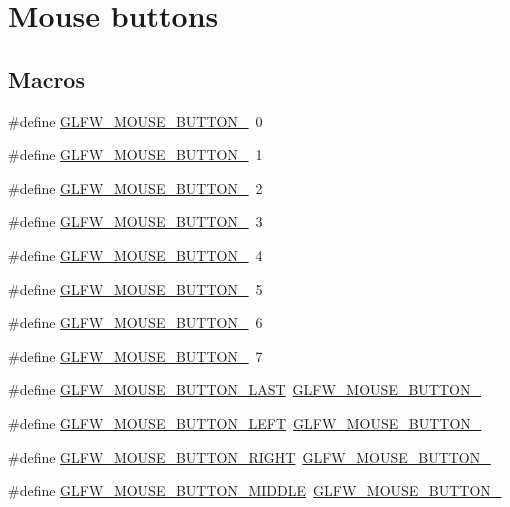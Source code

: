 \hypertarget{group__buttons}{\section{Mouse buttons}
\label{group__buttons}
}
\subsection*{Macros}
\begin{DoxyCompactItemize}
\item 
\#define \hyperlink{group__buttons_ga181a6e875251fd8671654eff00f9112e}{G\-L\-F\-W\-\_\-\-M\-O\-U\-S\-E\-\_\-\-B\-U\-T\-T\-O\-N\-\_}~0
\item 
\#define \hyperlink{group__buttons_ga604b39b92c88ce9bd332e97fc3f4156c}{G\-L\-F\-W\-\_\-\-M\-O\-U\-S\-E\-\_\-\-B\-U\-T\-T\-O\-N\-\_}~1
\item 
\#define \hyperlink{group__buttons_ga0130d505563d0236a6f85545f19e1721}{G\-L\-F\-W\-\_\-\-M\-O\-U\-S\-E\-\_\-\-B\-U\-T\-T\-O\-N\-\_}~2
\item 
\#define \hyperlink{group__buttons_ga53f4097bb01d5521c7d9513418c91ca9}{G\-L\-F\-W\-\_\-\-M\-O\-U\-S\-E\-\_\-\-B\-U\-T\-T\-O\-N\-\_}~3
\item 
\#define \hyperlink{group__buttons_gaf08c4ddecb051d3d9667db1d5e417c9c}{G\-L\-F\-W\-\_\-\-M\-O\-U\-S\-E\-\_\-\-B\-U\-T\-T\-O\-N\-\_}~4
\item 
\#define \hyperlink{group__buttons_gae8513e06aab8aa393b595f22c6d8257a}{G\-L\-F\-W\-\_\-\-M\-O\-U\-S\-E\-\_\-\-B\-U\-T\-T\-O\-N\-\_}~5
\item 
\#define \hyperlink{group__buttons_ga8b02a1ab55dde45b3a3883d54ffd7dc7}{G\-L\-F\-W\-\_\-\-M\-O\-U\-S\-E\-\_\-\-B\-U\-T\-T\-O\-N\-\_}~6
\item 
\#define \hyperlink{group__buttons_ga35d5c4263e0dc0d0a4731ca6c562f32c}{G\-L\-F\-W\-\_\-\-M\-O\-U\-S\-E\-\_\-\-B\-U\-T\-T\-O\-N\-\_}~7
\item 
\#define \hyperlink{group__buttons_gab1fd86a4518a9141ec7bcde2e15a2fdf}{G\-L\-F\-W\-\_\-\-M\-O\-U\-S\-E\-\_\-\-B\-U\-T\-T\-O\-N\-\_\-\-L\-A\-S\-T}~\hyperlink{group__buttons_ga35d5c4263e0dc0d0a4731ca6c562f32c}{G\-L\-F\-W\-\_\-\-M\-O\-U\-S\-E\-\_\-\-B\-U\-T\-T\-O\-N\-\_}
\item 
\#define \hyperlink{group__buttons_gaf37100431dcd5082d48f95ee8bc8cd56}{G\-L\-F\-W\-\_\-\-M\-O\-U\-S\-E\-\_\-\-B\-U\-T\-T\-O\-N\-\_\-\-L\-E\-F\-T}~\hyperlink{group__buttons_ga181a6e875251fd8671654eff00f9112e}{G\-L\-F\-W\-\_\-\-M\-O\-U\-S\-E\-\_\-\-B\-U\-T\-T\-O\-N\-\_}
\item 
\#define \hyperlink{group__buttons_ga3e2f2cf3c4942df73cc094247d275e74}{G\-L\-F\-W\-\_\-\-M\-O\-U\-S\-E\-\_\-\-B\-U\-T\-T\-O\-N\-\_\-\-R\-I\-G\-H\-T}~\hyperlink{group__buttons_ga604b39b92c88ce9bd332e97fc3f4156c}{G\-L\-F\-W\-\_\-\-M\-O\-U\-S\-E\-\_\-\-B\-U\-T\-T\-O\-N\-\_}
\item 
\#define \hyperlink{group__buttons_ga34a4d2a701434f763fd93a2ff842b95a}{G\-L\-F\-W\-\_\-\-M\-O\-U\-S\-E\-\_\-\-B\-U\-T\-T\-O\-N\-\_\-\-M\-I\-D\-D\-L\-E}~\hyperlink{group__buttons_ga0130d505563d0236a6f85545f19e1721}{G\-L\-F\-W\-\_\-\-M\-O\-U\-S\-E\-\_\-\-B\-U\-T\-T\-O\-N\-\_}
\end{DoxyCompactItemize}



